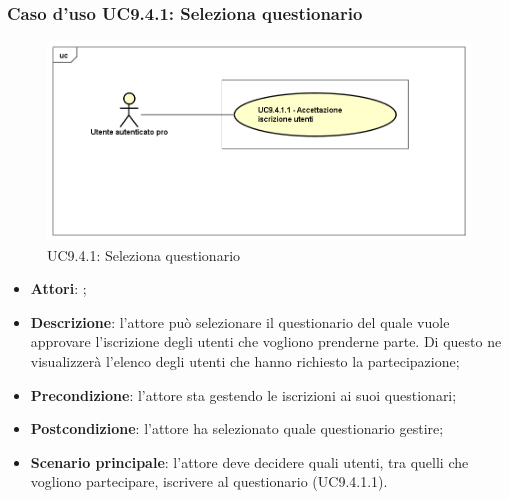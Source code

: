 		 \subsubsection{Caso d'uso UC9.4.1: Seleziona questionario}
		 \label{UC9.4.1}
		 \begin{figure}[h]
		 	\centering
		 	\includegraphics[scale=0.5,keepaspectratio]{UML/UC9_4_1.png}
		 	\caption{UC9.4.1: Seleziona questionario}
		 \end{figure}
		 \FloatBarrier
		 \begin{itemize}
		 	\item \textbf{Attori}: \uaupro{};
		 	\item \textbf{Descrizione}: l'attore può selezionare il questionario del quale vuole approvare l'iscrizione degli utenti che vogliono prenderne parte. Di questo ne visualizzerà l'elenco degli utenti che hanno richiesto la partecipazione; 
		 	\item \textbf{Precondizione}: l'attore sta gestendo le iscrizioni ai suoi questionari;
		 	\item \textbf{Postcondizione}: l'attore ha selezionato quale questionario gestire;
		 	\item \textbf{Scenario principale}: l'attore deve decidere quali utenti, tra quelli che vogliono partecipare, iscrivere al questionario (UC9.4.1.1).
		 \end{itemize}
		 
